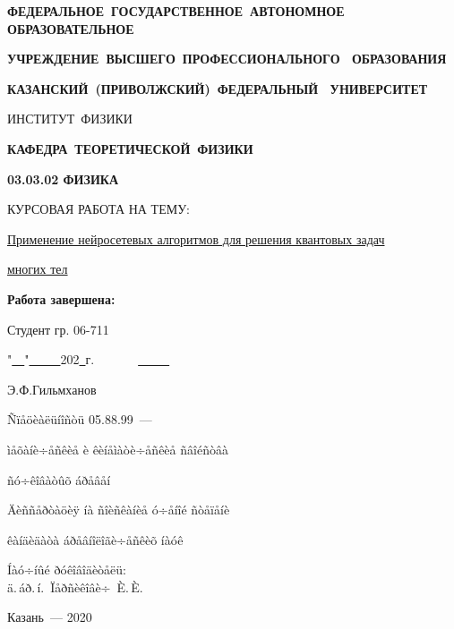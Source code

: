 \begin{titlepage}
\centerline{\textbf{ФЕДЕРАЛЬНОЕ~ГОСУДАРСТВЕННОЕ~АВТОНОМНОЕ~ ОБРАЗОВАТЕЛЬНОЕ}}
\centerline{\textbf{УЧРЕЖДЕНИЕ~ВЫСШЕГО~ПРОФЕССИОНАЛЬНОГО~ ОБРАЗОВАНИЯ}}
\centerline{\textbf{КАЗАНСКИЙ~(ПРИВОЛЖСКИЙ)~ФЕДЕРАЛЬНЫЙ~ УНИВЕРСИТЕТ}}
\vfill
\centerline{ИНСТИТУТ~ФИЗИКИ}
\centerline{\textbf{КАФЕДРА~ТЕОРЕТИЧЕСКОЙ~ФИЗИКИ}}
\vfill
\centerline{\textbf{03.03.02 ФИЗИКА}}
\vfill
\large
\centerline{КУРСОВАЯ РАБОТА НА ТЕМУ:}
\centerline{\underline{Применение нейросетевых алгоритмов для решения квантовых задач}}
\centerline{\underline{многих тел}}
\vfill
\begin{flushleft}
    \textbf{Работа завершена:}
    
    Студент гр. 06-711
    
    "\underline{\ \ }"\underline{\ \ \ \ \ }202\underline{\ }г.\ \ \ \ \ \ \ \underline{\ \ \ \ \ }
\end{flushleft}
\begin{flushright}
    Э.Ф.Гильмханов
\end{flushright}
\normalsize
\vfill
\centerline{Ñïåöèàëüíîñòü 05.88.99~--- }
\centerline{ìåõàíè÷åñêèå è êèíåìàòè÷åñêèå ñâîéñòâà}
\centerline{ñó÷êîâàòûõ áðåâåí}
\vfill
\centerline{Äèññåðòàöèÿ íà ñîèñêàíèå ó÷åíîé ñòåïåíè}
\centerline{êàíäèäàòà áðåâíîëîãè÷åñêèõ íàóê}
\vfill
\vfill
\begin{flushright}
Íàó÷íûé ðóêîâîäèòåëü:\\
ä.\,áð.\,í.~Ïåðñèêîâè÷~È.\,È.
\end{flushright}
\vfill
\vfill
\centerline{Казань~--- 2020}
\end{titlepage}

\setcounter{page}{2}